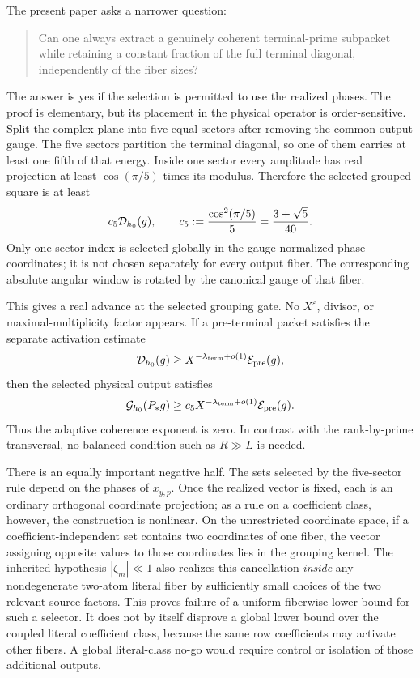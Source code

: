 The present paper asks a narrower question:
\begin{quote}
Can one always extract a genuinely coherent terminal-prime subpacket while
retaining a constant fraction of the full terminal diagonal, independently
of the fiber sizes?
\end{quote}
The answer is yes if the selection is permitted to use the realized phases.
The proof is elementary, but its placement in the physical operator is
order-sensitive.  Split the complex plane into five equal sectors after
removing the common output gauge.  The five sectors partition the terminal
diagonal, so one of them carries at least one fifth of that energy.  Inside
one sector every amplitude has real projection at least
\(\cos(\pi/5)\) times its modulus.  Therefore the selected grouped square
is at least
\begin{equation}
 c_5\mathcal D_{h_0}(g),
 \qquad
 c_5:=\frac{\cos^2(\pi/5)}5
      =\frac{3+\sqrt5}{40}.
 \label{eq:tpc56-intro-pentant-constant}
\end{equation}
Only one sector index is selected globally in the gauge-normalized phase
coordinates; it is not chosen separately for every output fiber.  The
corresponding absolute angular window is rotated by the canonical gauge of
that fiber.

This gives a real advance at the selected grouping gate.  No
\(X^{\varepsilon}\), divisor, or maximal-multiplicity factor appears.
If a pre-terminal packet satisfies the separate activation estimate
\begin{equation}
 \mathcal D_{h_0}(g)\ge
 X^{-\lambda_{\rm term}+o(1)}\mathcal E_{\rm pre}(g),
 \label{eq:tpc56-intro-activation}
\end{equation}
then the selected physical output satisfies
\begin{equation}
 \mathcal G_{h_0}(P_*g)
 \ge c_5X^{-\lambda_{\rm term}+o(1)}\mathcal E_{\rm pre}(g).
 \label{eq:tpc56-intro-selected-transfer}
\end{equation}
Thus the adaptive coherence exponent is zero.  In contrast with the
rank-by-prime transversal, no balanced condition such as \(R\gg L\) is
needed.

There is an equally important negative half.  The sets selected by the
five-sector rule depend on the phases of \(x_{y,p}\).  Once the realized
vector is fixed, each is an ordinary orthogonal coordinate projection;
as a rule on a coefficient class, however, the construction is nonlinear.
On the unrestricted coordinate space, if a coefficient-independent set
contains two coordinates of one fiber, the vector assigning opposite values
to those coordinates lies in the grouping kernel.  The inherited hypothesis
\(|\zeta_m|\ll1\) also realizes this cancellation \emph{inside} any
nondegenerate two-atom literal fiber by sufficiently small choices of the
two relevant source factors.  This proves failure of a uniform fiberwise
lower bound for such a selector.  It does not by itself disprove a global
lower bound over the coupled literal coefficient class, because the same
row coefficients may activate other fibers.  A global literal-class no-go
would require control or isolation of those additional outputs.

